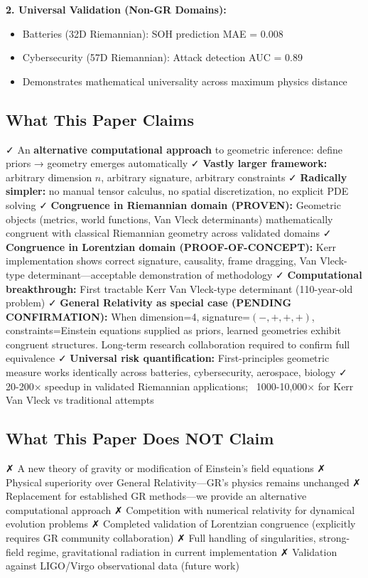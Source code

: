 \documentclass[11pt,a4paper]{article}
\begin{document}
\textbf{2. Universal Validation (Non-GR Domains):}
\begin{itemize}
\item Batteries (32D Riemannian): SOH prediction MAE = 0.008
\item Cybersecurity (57D Riemannian): Attack detection AUC = 0.89
\item Demonstrates mathematical universality across maximum physics distance
\end{itemize}

\subsection*{What This Paper Claims}

✓ An \textbf{alternative computational approach} to geometric inference: define priors → geometry emerges automatically  
✓ \textbf{Vastly larger framework:} arbitrary dimension $n$, arbitrary signature, arbitrary constraints  
✓ \textbf{Radically simpler:} no manual tensor calculus, no spatial discretization, no explicit PDE solving  
✓ \textbf{Congruence in Riemannian domain (PROVEN):} Geometric objects (metrics, world functions, Van Vleck determinants) mathematically congruent with classical Riemannian geometry across validated domains  
✓ \textbf{Congruence in Lorentzian domain (PROOF-OF-CONCEPT):} Kerr implementation shows correct signature, causality, frame dragging, Van Vleck-type determinant—acceptable demonstration of methodology  
✓ \textbf{Computational breakthrough:} First tractable Kerr Van Vleck-type determinant (110-year-old problem)  
✓ \textbf{General Relativity as special case (PENDING CONFIRMATION):} When dimension=4, signature=$(-,+,+,+)$, constraints=Einstein equations supplied as priors, learned geometries exhibit congruent structures. Long-term research collaboration required to confirm full equivalence  
✓ \textbf{Universal risk quantification:} First-principles geometric measure works identically across batteries, cybersecurity, aerospace, biology  
✓ 20-200× speedup in validated Riemannian applications; ~1000-10,000× for Kerr Van Vleck vs traditional attempts

\subsection*{What This Paper Does NOT Claim}

✗ A new theory of gravity or modification of Einstein's field equations  
✗ Physical superiority over General Relativity—GR's physics remains unchanged  
✗ Replacement for established GR methods—we provide an alternative computational approach  
✗ Competition with numerical relativity for dynamical evolution problems  
✗ Completed validation of Lorentzian congruence (explicitly requires GR community collaboration)  
✗ Full handling of singularities, strong-field regime, gravitational radiation in current implementation  
✗ Validation against LIGO/Virgo observational data (future work)
\end{document}
